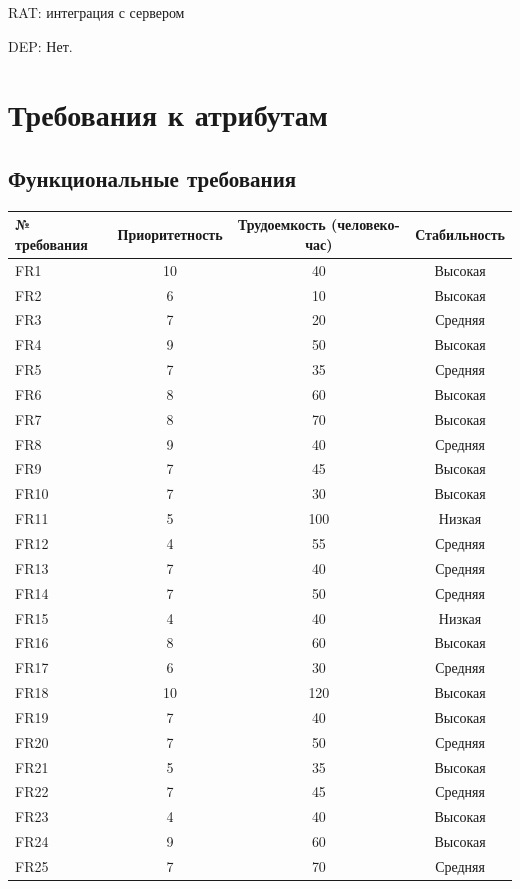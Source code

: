 \documentclass{scrreprt}
\begin{document}
RAT: интеграция с сервером

DEP: Нет.

\chapter{Требования к атрибутам}
\section{Функциональные требования}
\begin{table}[h]
	\centering
	\begin{tabular}{|l|c|c|c|}
		\hline
		№ требования & Приоритетность & Трудоемкость (человеко-час) & Стабильность \\ \hline
		FR1 & 10 & 40 & Высокая \\ \hline
		FR2 & 6 & 10 & Высокая \\ \hline
		FR3 & 7 & 20 & Средняя \\ \hline
		FR4 & 9 & 50 & Высокая \\ \hline
		FR5 & 7 & 35 & Средняя \\ \hline
		FR6 & 8 & 60 & Высокая \\ \hline
		FR7 & 8 & 70 & Высокая \\ \hline
		FR8 & 9 & 40 & Средняя \\ \hline
		FR9 & 7 & 45 & Высокая \\ \hline
		FR10 & 7 & 30 & Высокая \\ \hline
		FR11 & 5 & 100 & Низкая \\ \hline
		FR12 & 4 & 55 & Средняя \\ \hline
		FR13 & 7 & 40 & Средняя \\ \hline
		FR14 & 7 & 50 & Средняя \\ \hline
		FR15 & 4 & 40 & Низкая \\ \hline
		FR16 & 8 & 60 & Высокая \\ \hline
		FR17 & 6 & 30 & Средняя \\ \hline
		FR18 & 10 & 120 & Высокая \\ \hline
		FR19 & 7 & 40 & Высокая \\ \hline
		FR20 & 7 & 50 & Средняя \\ \hline
		FR21 & 5 & 35 & Высокая \\ \hline
		FR22 & 7 & 45 & Средняя \\ \hline
		FR23 & 4 & 40 & Высокая \\ \hline
		FR24 & 9 & 60 & Высокая \\ \hline
		FR25 & 7 & 70 & Средняя \\ \hline

\end{tabular}
\end{table}
\end{document}
